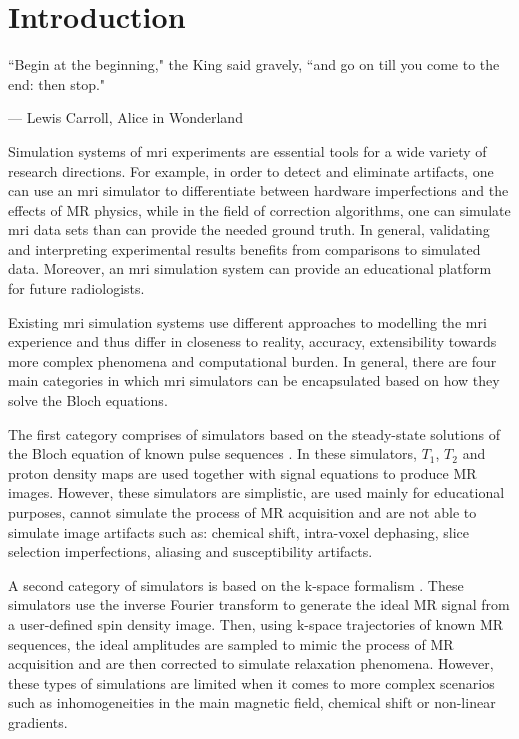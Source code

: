 \chapter{Introduction}
\label{chapterlabel1}
\epigraph{``Begin at the beginning," the King said gravely, ``and go on till you come to the end: then stop."}{--- \textup{Lewis Carroll}, Alice in Wonderland}


Simulation systems of \ac{mri} experiments are essential tools for a wide variety of research directions.
For example, in order to detect and eliminate artifacts, one can use an \ac{mri} simulator to differentiate between hardware imperfections and the effects of MR physics,
while in the field of correction algorithms, one can simulate \ac{mri} data sets than can provide the needed ground truth.
In general, validating and interpreting experimental results benefits from comparisons to simulated data.
Moreover, an \ac{mri} simulation system can provide an educational platform for future radiologists.

\hfill

Existing \ac{mri} simulation systems use different approaches to modelling the \ac{mri} experience and thus differ in closeness to reality, accuracy, extensibility towards more complex phenomena and computational burden.
In general, there are four main categories in which \ac{mri} simulators can be encapsulated based on how they solve the Bloch equations.

\hfill

The first category comprises of simulators based on the steady-state solutions of the Bloch equation of known pulse sequences \cite{Riederer1984} \cite{Ortendahl1984} \cite{Bobman1985} \cite{Lufkin1986}.
In these simulators, $T_1$, $T_2$ and proton density maps are used together with signal equations 
to produce MR images.
However, these simulators are simplistic, are used mainly for educational purposes, cannot simulate the process of MR acquisition and are not able to simulate image artifacts such as: chemical shift, intra-voxel dephasing, slice selection imperfections, aliasing and susceptibility artifacts.

\hfill

A second category of simulators is based on the k-space formalism \cite{Petersson1993}.
These simulators use the inverse Fourier transform to generate the ideal MR signal from a user-defined spin density image.
Then, using k-space trajectories of known MR sequences, the ideal amplitudes are sampled to mimic the process of MR acquisition and are then corrected to simulate relaxation phenomena.
However, these types of simulations are limited when it comes to more complex scenarios such as inhomogeneities in the main magnetic field, chemical shift or non-linear gradients.

